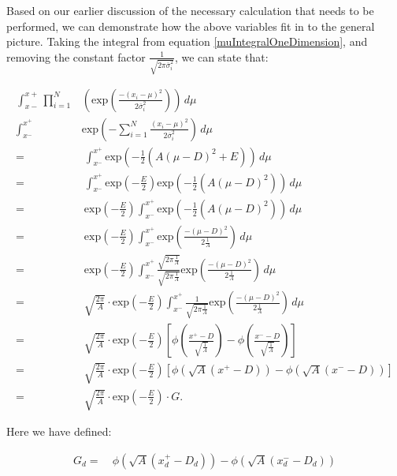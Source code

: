 \documentclass[11pt]{article}
\newcommand{\sig}{\overline{\sigma}_i}
\newcommand{\eq}{=&\ }
\begin{document}
Based on our earlier discussion of the necessary calculation that needs to be performed, we can demonstrate how the above variables fit in to the general picture. Taking the integral from equation \ref{muIntegralOneDimension}, and removing the constant factor $ \frac{1}{\sqrt{2\pi\sig^2}}$, we can state that:

\begin{align*}
	\int_{x-}^{x+} \prod_{i=1}^{N} & \left(  \text{exp}\left( \frac{-(x_i-\mu)^2 }{ 2\sig^2 }\right)\right)\,d\mu \\
	\int_{x^-}^{x^+} & \text{exp}\left( -\sum_{i=1}^{N} \frac{(x_i-\mu)^2 }{ 2\sig^2 } \right)\,d\mu \nonumber \\
	\eq \int_{x^-}^{x^+} \text{exp}\left( -\frac{1}{2}\left( A(\mu - D)^2 + E \right) \right)\,d\mu \\
	\eq \int_{x^-}^{x^+} \text{exp}\left(-\frac{E}{2}\right) \text{exp}\left( -\frac{1}{2}\left( A(\mu - D)^2 \right) \right)\,d\mu \\
	\eq \text{exp}\left(-\frac{E}{2}\right) \int_{x^-}^{x^+} \text{exp}\left( -\frac{1}{2}\left( A(\mu - D)^2 \right) \right)\,d\mu \\
	\eq \text{exp}\left(-\frac{E}{2}\right) \int_{x^-}^{x^+} \text{exp}\left( \frac{-(\mu - D)^2}{2\frac{1}{A}}\right)\,d\mu \\
	\eq \text{exp}\left(-\frac{E}{2}\right) \int_{x^-}^{x^+} \frac{\sqrt{2\pi\frac{1}{A}}}{\sqrt{2\pi\frac{1}{A}}} \text{exp}\left( \frac{-(\mu - D)^2}{2\frac{1}{A}}\right)\,d\mu \\
	\eq \sqrt{\frac{2\pi}{A}}\cdot\text{exp}\left(-\frac{E}{2}\right) \int_{x^-}^{x^+} \frac{1}{\sqrt{2\pi\frac{1}{A}}} \text{exp}\left( \frac{-(\mu - D)^2}{2\frac{1}{A}}\right)\,d\mu \\
	\eq \sqrt{\frac{2\pi}{A}}\cdot\text{exp}\left(-\frac{E}{2}\right) \left[ \phi\left(\frac{x^+-D}{\sqrt{\frac{1}{A}}}\right) - \phi\left(\frac{x^--D}{\sqrt{\frac{1}{A}}}\right) \right] \\
	\eq \sqrt{\frac{2\pi}{A}}\cdot\text{exp}\left(-\frac{E}{2}\right) \left[ \phi\left(\sqrt{A}(x^+-D)\right) - \phi\left(\sqrt{A}(x^--D)\right) \right] \\
	\eq \sqrt{\frac{2\pi}{A}}\cdot\text{exp}\left(-\frac{E}{2}\right) \cdot G.
\end{align*}

Here we have defined:

\begin{align*}
	G_d \eq \phi\left(\sqrt{A}(x_d^+-D_d)\right) - \phi\left(\sqrt{A}(x_d^--D_d)\right)
\end{align*}
\end{document}
